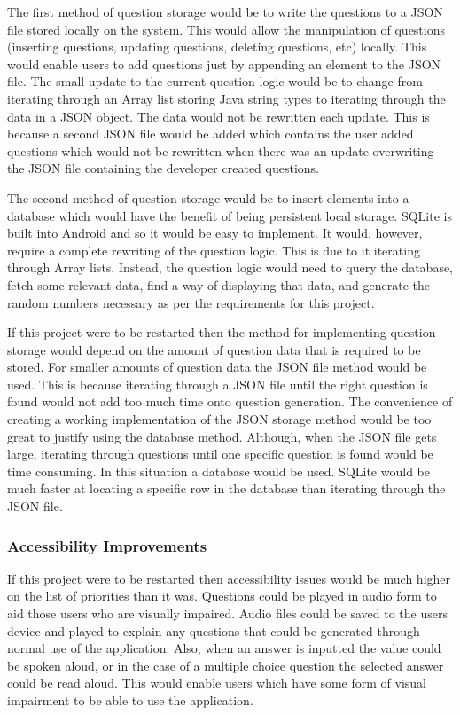 \documentclass{article}
\begin{document}
The first method of question storage would be to write the questions to a JSON file stored locally on the system. This would allow the manipulation of questions (inserting questions, updating questions, deleting questions, etc) locally. This would enable users to add questions just by appending an element to the JSON file. The small update to the current question logic would be to change from iterating through an Array list storing Java string types to iterating through the data in a JSON object. The data would not be rewritten each update. This is because a second JSON file would be added which contains the user added questions which would not be rewritten when there was an update overwriting the JSON file containing the developer created questions. \par

The second method of question storage would be to insert elements into a database which would have the benefit of being persistent local storage. SQLite is built into Android and so it would be easy to implement. It would, however, require a complete rewriting of the question logic. This is due to it iterating through Array lists. Instead, the question logic would need to query the database, fetch some relevant data, find a way of displaying that data, and generate the random numbers necessary as per the requirements for this project. \par

If this project were to be restarted then the method for implementing question storage would depend on the amount of question data that is required to be stored. For smaller amounts of question data the JSON file method would be used. This is because iterating through a JSON file until the right question is found would not add too much time onto question generation. The convenience of creating a working implementation of the JSON storage method would be too great to justify using the database method. Although, when the JSON file gets large, iterating through questions until one specific question is found would be time consuming. In this situation a database would be used. SQLite would be much faster at locating a specific row in the database than iterating through the JSON file. \par

\subsubsection{Accessibility Improvements}

If this project were to be restarted then accessibility issues would be much higher on the list of priorities than it was. Questions could be played in audio form to aid those users who are visually impaired. Audio files could be saved to the users device and played to explain any questions that could be generated through normal use of the application. Also, when an answer is inputted the value could be spoken aloud, or in the case of a multiple choice question the selected answer could be read aloud. This would enable users which have some form of visual impairment to be able to use the application. \par
\end{document}
